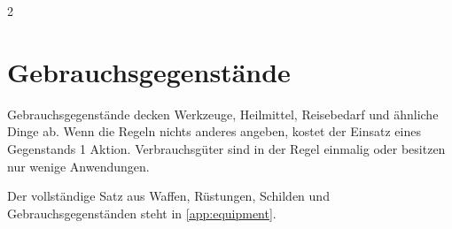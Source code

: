 \begin{multicols*}{2}
\section{Gebrauchsgegenstände}\label{sec:gebrauchsgegenstande}

Gebrauchsgegenstände decken Werkzeuge, Heilmittel, Reisebedarf und ähnliche Dinge ab.
Wenn die Regeln nichts anderes angeben, kostet der Einsatz eines Gegenstands 1 Aktion.
Verbrauchsgüter sind in der Regel einmalig oder besitzen nur wenige Anwendungen.

Der vollständige Satz aus Waffen, Rüstungen, Schilden und Gebrauchsgegenständen steht in \cref{app:equipment}.
\end{multicols*}
